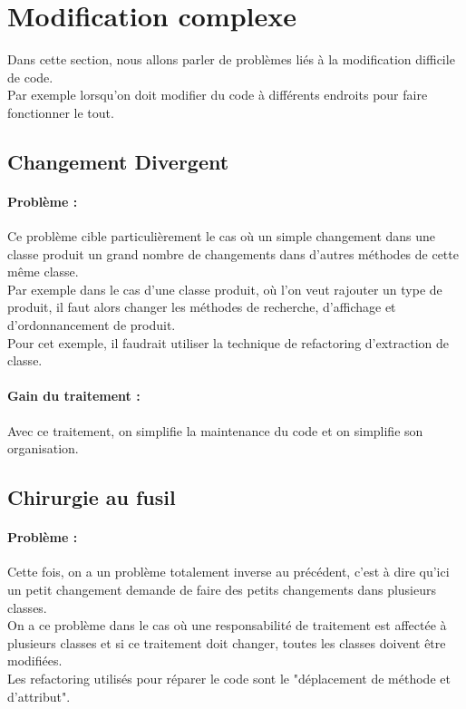 \documentclass[a4paper,twoside,12pt,openright]{report}
\begin{document}
\section{Modification complexe}
Dans cette section, nous allons parler de problèmes liés à la modification difficile de code.\\
Par exemple lorsqu'on doit modifier du code à différents endroits pour faire fonctionner le tout.\\

\subsection{Changement Divergent}
\paragraph{Problème :}
Ce problème cible particulièrement le cas où un simple changement dans une classe produit un grand nombre de changements dans d'autres méthodes de cette même classe.\\
Par exemple dans le cas d'une classe produit, où l'on veut rajouter un type de produit, il faut alors changer les méthodes de recherche, d'affichage et d'ordonnancement de produit.\\
Pour cet exemple, il faudrait utiliser la technique de refactoring d'extraction de classe.\\

\paragraph{Gain du traitement :}
Avec ce traitement, on simplifie la maintenance du code et on simplifie son organisation.\\

\subsection{Chirurgie au fusil}
\paragraph{Problème :}
Cette fois, on a un problème totalement inverse au précédent, c'est à dire qu'ici un petit changement demande de faire des petits changements dans plusieurs classes.\\
On a ce problème dans le cas où une responsabilité de traitement est affectée à plusieurs classes et si ce traitement doit changer, toutes les classes doivent être modifiées.\\
Les refactoring utilisés pour réparer le code sont le "déplacement de méthode et d'attribut".\\
\end{document}
